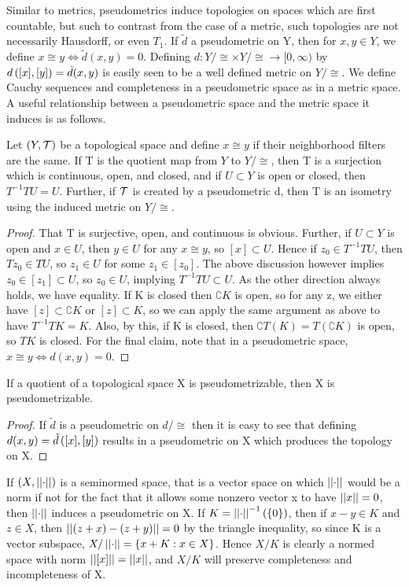 Similar to metrics, pseudometrics induce topologies on spaces which are first countable, but such to contrast from the case of a metric, such topologies are not necessarily Hausdorff, or even $T_1$. If $\tilde{d}$ a pseudometric on Y, then for $x,y \in Y$, we define $x \cong y \iff \tilde{d}(x,y)=0$. Defining $d:Y/\cong \times Y/\cong \to [0,\infty)$ by $d\left( [x],[y]\right) = \tilde{d}(x,y)$ is easily seen to be a well defined metric on $Y/\cong$. We define Cauchy sequences and completeness in a pseudometric space as in a metric space. A useful relationship between a pseudometric space and the metric space it induces is as follows. 
\begin{prop}
    \label{prop:pseudometricembedding}
    Let $(Y,\mathcal{T})$ be a topological space and define $x \cong y$ if their neighborhood filters are the same. If T is the quotient map from $Y$ to $Y/\cong$, then T is a surjection which is continuous, open, and closed, and if $U \subset Y$ is open or closed, then $T^{-1} T U = U$. 
    Further, if $\mathcal{T}$ is created by a pseudometric d, then T is an isometry using the induced metric on $Y/\cong$.
    \begin{proof}
        That T is surjective, open, and continuous is obvious. Further, if $U \subset Y$ is open and $x \in U$, then $y \in U$ for any $x \cong y$, so $[x] \subset U$. Hence if $z_0 \in T^{-1} T U$, then $Tz_0 \in TU$, so $z_1 \in U$ for some $z_1 \in [z_0]$. The above discussion however implies $z_0 \in [z_1] \subset U$, so $z_0 \in U$, implying $T^{-1}T U \subset U$. As the other direction always holds, we have equality. 
        If K is closed then $\complement K$ is open, so for any z, we either have $[z] \subset \complement K$ or $[z] \subset K$, so we can apply the same argument as above to have $T^{-1}TK =K$. 
        Also, by this, if K is closed, then $\complement T(K) = T(\complement K)$ is open, so $TK$ is closed. 
        For the final claim, note that in a pseudometric space, $x \cong y \iff d(x,y) = 0$. 
    \end{proof} 
\end{prop} 


\begin{prop}
    \label{prop:pseudometrizableprequotient}
    If a quotient of a topological space X is pseudometrizable, then X is pseudometrizable.
    \begin{proof}
        If $\tilde{d}$ is a pseudometric on $d/\cong$ then it is easy to see that defining $d(x,y)=\tilde{d}\left( [x],[y]\right)$ results in a pseudometric on X which produces the topology on X. 
    \end{proof} 
\end{prop} 
If $(X,\left|\left| \cdot \right|\right|)$ is a seminormed space, that is a vector space on which $\left|\left| \cdot \right|\right|$ would be a norm if not for the fact that it allows some nonzero vector x to have $\left|\left| x \right|\right|=0$, then $\left|\left| \cdot \right|\right|$ induces a pseudometric on X. 
If $K=\left|\left| \cdot \right|\right|^{-1}(\{0\})$, then if $x-y \in K$ and $z \in X$, then $\left|\left| (z+x)-(z+y) \right|\right|=0$ by the triangle inequality, so since K is a vector subspace, $X/\left|\left| \cdot \right|\right|=\{x+K: x \in X\}$.
Hence $X/K$ is clearly a normed space with norm $\left|\left| [x] \right|\right| = \left|\left| x \right|\right|$, and $X/K$ will preserve completeness and incompleteness of X. 

